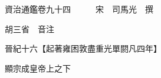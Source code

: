 










 


 
 


 

  
  
  
  
  





  
  
  
  
  
 
  

  

  
  
  



  

 
 

  
   




  

  
  


  　　資治通鑑卷九十四　　　宋　司馬光　撰

　　胡三省　音注

　　晉紀十六【起著雍困敦盡重光單閼凡四年】

　　顯宗成皇帝上之下

